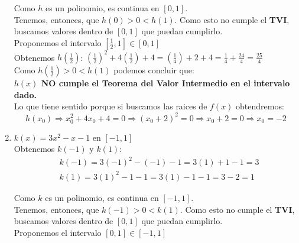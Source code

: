 \documentclass[12pt]{article}
\begin{document}
\begin{enumerate}[\hspace{9px} a)]
        Como $h$ es un polinomio, es continua en $[0,1]$.\\

        Tenemos, entonces, que \(h(0) > 0 < h(1)\). Como esto no cumple el \textbf{TVI}, buscamos valores dentro de $[0,1]$ que puedan cumplirlo.\\

        Proponemos el intervalo $\left[\frac{1}{2},1\right] \in [0,1]$\\

        Obtenemos \(h\left(\displaystyle\frac{1}{2}\right)\): \quad \(\left(\displaystyle\frac{1}{2}\right)^2+4\left(\displaystyle\frac{1}{2}\right)+4 = \left(\displaystyle\frac{1}{4}\right)+2+4 = \displaystyle\frac{1}{4}+\displaystyle\frac{24}{4}=\displaystyle\frac{25}{4}\)
        \\

        Como \(h\left(\displaystyle\frac{1}{2}\right) > 0 < h(1)\) podemos concluir que:\\

        \textbf{$h(x)$ NO cumple el Teorema del Valor Intermedio en el intervalo dado.}\\

        Lo que tiene sentido porque si buscamos las raices de $f(x)$ obtendremos:
        \begin{equation*}
            h(x_0) \Rightarrow x_0^2+4x_0+4=0 \Rightarrow (x_0+2)^2=0 \Rightarrow x_0+2=0 \Rightarrow x_0=-2
        \end{equation*}

    \item \(k(x)=3x^2-x-1\) en $[-1,1]$\\

        Obtenemos $k(-1)$ y $k(1)$:
        \begin{align*}
            &k(-1)=3(-1)^2-(-1)-1=3(1)+1-1=3 \\
            &k(1)=3(1)^2-1-1=3(1)-1-1=3-2=1
        \end{align*}

        Como $k$ es un polinomio, es continua en $[-1,1]$.\\

        Tenemos, entonces, que \(k(-1) > 0 < k(1)\). Como esto no cumple el \textbf{TVI}, buscamos valores dentro de $[0,1]$ que puedan cumplirlo.\\

        Proponemos el intervalo $[0,1] \in [-1,1]$\\


\end{enumerate}
\end{document}
